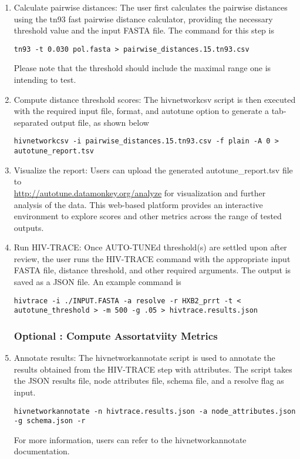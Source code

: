 \documentclass[utf8]{FrontiersinHarvard} %
\begin{document}
\begin{enumerate}

\item{ Calculate pairwise distances: The user first calculates the pairwise distances using the tn93 fast pairwise distance calculator, providing the necessary threshold value and the input FASTA file. The command for this step is 
\begin{lstlisting}[style=BashInputStyle]
 tn93 -t 0.030 pol.fasta > pairwise_distances.15.tn93.csv
\end{lstlisting}

Please note that the threshold should include the maximal range one is intending to test.
}

\item {Compute distance threshold scores: The hivnetworkcsv script is then executed with the required input file, format, and autotune option to generate a tab-separated output file, as shown below
\begin{lstlisting}[style=BashInputStyle]
 hivnetworkcsv -i pairwise_distances.15.tn93.csv -f plain -A 0 > autotune_report.tsv
\end{lstlisting}
}

\item {Visualize the report: Users can upload the generated autotune\_report.tsv file to \\
  \url{http://autotune.datamonkey.org/analyze} for visualization and further analysis of the data. This web-based platform provides an interactive environment to explore scores and other metrics across the range of tested outputs. }

\item {Run HIV-TRACE: Once AUTO-TUNEd threshold(s) are settled upon after review, the user runs the HIV-TRACE command with the appropriate input FASTA file, distance threshold, and other required arguments. The output is saved as a JSON file. An example command is
	\begin{lstlisting}[style=BashInputStyle]
hivtrace -i ./INPUT.FASTA -a resolve -r HXB2_prrt -t < autotune_threshold > -m 500 -g .05 > hivtrace.results.json
	\end{lstlisting}
}

\subsubsection{Optional : Compute Assortatviity Metrics}

\item{ Annotate results: The hivnetworkannotate script is used to annotate the results obtained from the HIV-TRACE step with attributes. The script takes the JSON results file, node attributes file, schema file, and a resolve flag as input.
	\begin{lstlisting}[style=BashInputStyle]
hivnetworkannotate -n hivtrace.results.json -a node_attributes.json -g schema.json -r
	\end{lstlisting}
 For more information, users can refer to the hivnetworkannotate documentation.
}


\end{enumerate}
\end{document}
